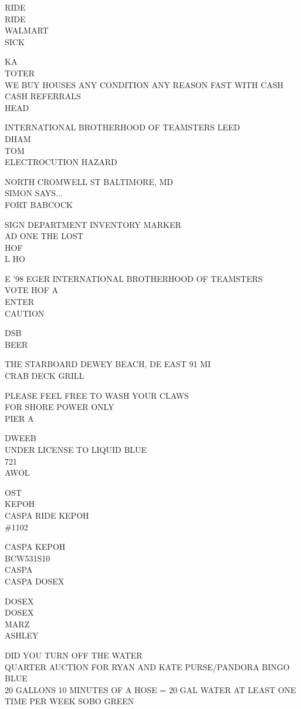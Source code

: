 \documentclass[10pt,letterpaper]{article}
\begin{document}
RIDE\\
RIDE\\
WALMART\\
SICK

KA\\
TOTER\\
WE BUY HOUSES ANY CONDITION ANY REASON FAST WITH CASH CASH REFERRALS\\
HEAD

INTERNATIONAL BROTHERHOOD OF TEAMSTERS LEED\\
DHAM\\
TOM\\
ELECTROCUTION HAZARD

NORTH CROMWELL ST BALTIMORE, MD\\
SIMON SAYS...\\
FORT BABCOCK

SIGN DEPARTMENT INVENTORY MARKER\\
AD ONE THE LOST\\
HOF\\
L HO

E '98 EGER INTERNATIONAL BROTHERHOOD OF TEAMSTERS\\
VOTE HOF A\\
ENTER\\
CAUTION

DSB\\
BEER

THE STARBOARD DEWEY BEACH, DE EAST 91 MI\\
CRAB DECK GRILL

PLEASE FEEL FREE TO WASH YOUR CLAWS\\
FOR SHORE POWER ONLY\\
PIER A

DWEEB\\
UNDER LICENSE TO LIQUID BLUE\\
721\\
AWOL

OST\\
KEPOH\\
CASPA RIDE KEPOH\\
\#1102

CASPA KEPOH\\
BCW531S10\\
CASPA\\
CASPA DOSEX

DOSEX\\
DOSEX\\
MARZ\\
ASHLEY

DID YOU TURN OFF THE WATER\\
QUARTER AUCTION FOR RYAN AND KATE PURSE/PANDORA BINGO\\
BLUE\\
20 GALLONS 10 MINUTES OF A HOSE = 20 GAL WATER AT LEAST ONE TIME PER WEEK SOBO GREEN
\end{document}
